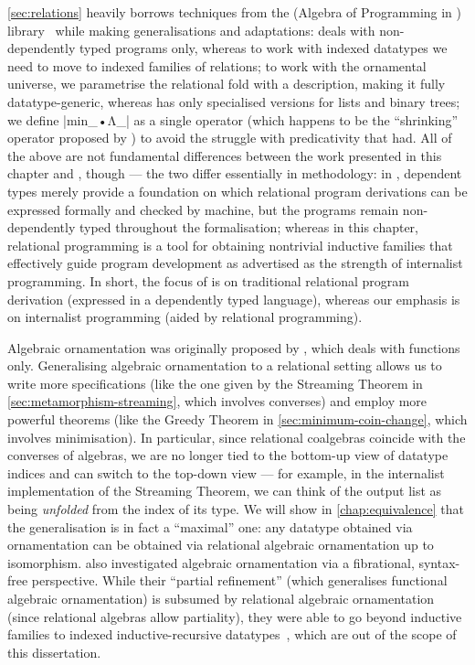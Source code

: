 \autoref{sec:relations} heavily borrows techniques from the  (Algebra of Programming in \Agda) library~\citep{Mu-AoPA} while making generalisations and adaptations:
 deals with non-dependently typed programs only, whereas to work with indexed datatypes we need to move to indexed families of relations; to work with the ornamental universe, we parametrise the relational fold with a description, making it fully datatype-generic, whereas  has only specialised versions for lists and binary trees; we define |min_•Λ_| as a single operator (which happens to be the ``shrinking'' operator proposed by \citet{Mu-Galois}) to avoid the struggle with predicativity that  had.
All of the above are not fundamental differences between the work presented in this chapter and , though --- the two differ essentially in methodology: in , dependent types merely provide a foundation on which relational program derivations can be expressed formally and checked by machine, but the programs remain non-dependently typed throughout the formalisation; whereas in this chapter, relational programming is a tool for obtaining nontrivial inductive families that effectively guide program development as advertised as the strength of internalist programming.
In short, the focus of  is on traditional relational program derivation (expressed in a dependently typed language), whereas our emphasis is on internalist programming (aided by relational programming).

Algebraic ornamentation was originally proposed by \citet{McBride-ornaments}, which deals with functions only.
Generalising algebraic ornamentation to a relational setting allows us to write more specifications (like the one given by the Streaming Theorem in \autoref{sec:metamorphism-streaming}, which involves converses) and employ more powerful theorems (like the Greedy Theorem in \autoref{sec:minimum-coin-change}, which involves minimisation).
In particular, since relational coalgebras coincide with the converses of algebras, we are no longer tied to the bottom-up view of datatype indices and can switch to the top-down view --- for example, in the internalist implementation of the Streaming Theorem, we can think of the output list as being \emph{unfolded} from the index of its type.
We will show in \autoref{chap:equivalence} that the generalisation is in fact a ``maximal'' one: any datatype obtained via ornamentation can be obtained via relational algebraic ornamentation up to isomorphism.
\citet{Atkey-refining-inductive-types} also investigated algebraic ornamentation via a fibrational, syntax-free perspective.
While their ``partial refinement'' (which generalises functional algebraic ornamentation) is subsumed by relational algebraic ornamentation (since relational algebras allow partiality), they were able to go beyond inductive families to indexed inductive-recursive datatypes~\citep{Dybjer-indexed-induction-recursion}, which are out of the scope of this dissertation.

